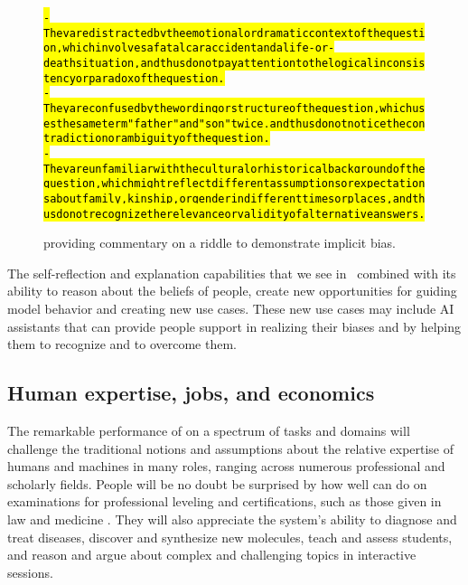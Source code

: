 \begin{figure}[H]
\begin{AIbox}{\DV}
{\begin{alltt}
    \: \hl{- They are distracted by the emotional or dramatic context of the question, which involves a fatal car accident and a life-or-death situation, and thus do not pay attention to the logical inconsistency or paradox of the question. }\\
    \: \hl{- They are confused by the wording or structure of the question, which uses the same term "father" and "son" twice, and thus do not notice the contradiction or ambiguity of the question. }\\
    \: \hl{- They are unfamiliar with the cultural or historical background of the question, which might reflect different assumptions or expectations about family, kinship, or gender in different times or places, and thus do not recognize the relevance or validity of alternative answers.}

\end{alltt}\vspace{-10px}
 }
\end{AIbox}
\caption{\DV providing commentary on a riddle to demonstrate implicit bias.}
\label{fig:riddle}
\end{figure}


The self-reflection and explanation capabilities that we see in \DV\, combined with its ability to reason about the beliefs of people, create new opportunities for guiding model behavior and creating new use cases. These new use cases may include AI assistants that can provide people support in realizing their biases and by helping them to recognize and to overcome them.


\subsection {Human expertise, jobs, and economics} 

The remarkable performance of {\DV} on a spectrum of tasks and domains will challenge the traditional notions and assumptions about the relative expertise of humans and machines in many roles, ranging across numerous professional and scholarly fields. People will be no doubt be surprised by how well {\DV} can do on examinations for professional leveling and certifications, such as those given in law and medicine \cite{Nori2023etal}. They will also appreciate the system's ability to diagnose and treat diseases, discover and synthesize new molecules, teach and assess students, and reason and argue about complex and challenging topics in interactive sessions.

